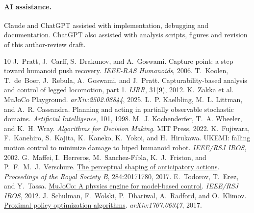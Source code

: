 \documentclass[10pt,twocolumn]{article}
\begin{document}
\paragraph{AI assistance.} Claude and ChatGPT assisted with implementation, debugging and documentation. ChatGPT also assisted with analysis scripts, figures and revision of this author-review draft.

\begin{thebibliography}{10}\footnotesize
{} J.~Pratt, J.~Carff, S.~Drakunov, and A.~Goswami. Capture point: a step toward humanoid push recovery. \emph{IEEE-RAS Humanoids}, 2006.
 T.~Koolen, T.~de~Boer, J.~Rebula, A.~Goswami, and J.~Pratt. Capturability-based analysis and control of legged locomotion, part 1. \emph{IJRR}, 31(9), 2012.
 K.~Zakka et al. MuJoCo Playground. \emph{arXiv:2502.08844}, 2025.
 L.~P. Kaelbling, M.~L. Littman, and A.~R. Cassandra. Planning and acting in partially observable stochastic domains. \emph{Artificial Intelligence}, 101, 1998.
 M.~J. Kochenderfer, T.~A. Wheeler, and K.~H. Wray. \emph{Algorithms for Decision Making}. MIT Press, 2022.
 K.~Fujiwara, F.~Kanehiro, S.~Kajita, K.~Kaneko, K.~Yokoi, and H.~Hirukawa. UKEMI: falling motion control to minimize damage to biped humanoid robot. \emph{IEEE/RSJ IROS}, 2002.
 G.~Maffei, I.~Herreros, M.~Sanchez-Fibla, K.~J.~Friston, and P.~F.~M.~J.~Verschure. \href{https://doi.org/10.1098/rspb.2017.1780}{The perceptual shaping of anticipatory actions}. \emph{Proceedings of the Royal Society B}, 284:20171780, 2017.
 E.~Todorov, T.~Erez, and Y.~Tassa. \href{https://doi.org/10.1109/IROS.2012.6386109}{MuJoCo: A physics engine for model-based control}. \emph{IEEE/RSJ IROS}, 2012.
 J.~Schulman, F.~Wolski, P.~Dhariwal, A.~Radford, and O.~Klimov. \href{https://arxiv.org/abs/1707.06347}{Proximal policy optimization algorithms}. \emph{arXiv:1707.06347}, 2017.
\end{thebibliography}
\end{document}
